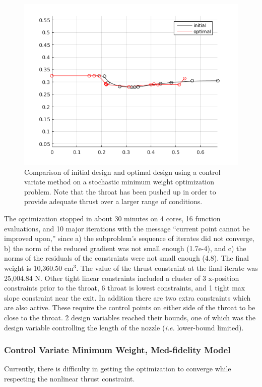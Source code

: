 \documentclass{article}
\begin{document}
\begin{figure}
\caption{Comparison of initial design and optimal design using a control variate method on a stochastic minimum weight optimization problem. Note that the throat has been pushed up in order to provide adequate thrust over a larger range of conditions.}
\label{fig:minWeightLofiCVSimpleResults}
\begin{center}
\includegraphics[scale=0.5]{figs/cv_lowfi_result.png}
\end{center}
\end{figure}

The optimization stopped in about 30 minutes on 4 cores, 16 function evaluations, and 10 major iterations with the message ``current point cannot be improved upon,'' since a) the subproblem's sequence of iterates did not converge, b) the norm of the reduced gradient was not small enough (1.7e-4), and c) the norms of the residuals of the constraints were not small enough (4.8). The final weight is 10,360.50 $\textrm{cm}^3$. The value of the thrust constraint at the final iterate was 25,004.84 N. Other tight linear constraints included a cluster of 3 x-position constraints prior to the throat, 6 throat is lowest constraints, and 1 tight max slope constraint near the exit. In addition there are two extra constraints which are also active. These require the control points on either side of the throat to be close to the throat. 2 design variables reached their bounds, one of which was the design variable controlling the length of the nozzle (\textit{i.e.} lower-bound limited).

\subsubsection{Control Variate Minimum Weight, Med-fidelity Model}

Currently, there is difficulty in getting the optimization to converge while respecting the nonlinear thrust constraint.
\end{document}
